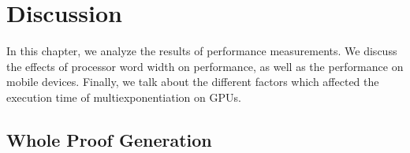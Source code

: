 
\chapter{Discussion} %

\label{Chapter7} %

In this chapter, we analyze the results of performance measurements. We discuss the effects of processor word width on performance, as well as the performance on mobile devices. Finally, we talk about the different factors which affected the execution time of multiexponentiation on GPUs.

\section{Whole Proof Generation}
\label{wholeproof}

